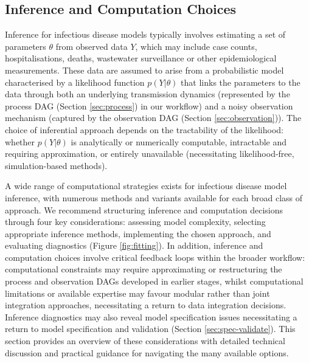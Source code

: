 \documentclass{article}
\begin{document}
\subsection{Inference and Computation Choices}\label{sec:fitting}

Inference for infectious disease models typically involves estimating a set of parameters $\theta$ from observed data $Y$, which may include case counts, hospitalisations, deaths, wastewater surveillance or other epidemiological measurements. These data are assumed to arise from a probabilistic model characterised by a likelihood function $p(Y | \theta)$ that links the parameters to the data through both an underlying transmission dynamics (represented by the process DAG (Section \ref{sec:process}) in our workflow) and a noisy observation mechanism (captured by the observation DAG (Section \ref{sec:observation})).  The choice of inferential approach depends on the tractability of the likelihood: 
whether $ p(Y | \theta)$ is analytically or numerically computable, intractable and requiring approximation, or entirely  unavailable (necessitating likelihood-free, simulation-based methods). 

A wide range of computational strategies exists for infectious disease model inference, with numerous methods and variants available for each broad class of approach.
We recommend structuring inference and computation decisions through four key considerations: assessing model complexity, selecting appropriate inference methods, implementing the chosen approach, and evaluating diagnostics (Figure \ref{fig:fitting}).
In addition, inference and computation choices involve critical feedback loops within the broader workflow: computational constraints may require approximating or restructuring the process and observation DAGs developed in earlier stages, whilst computational limitations or available expertise may favour modular rather than joint integration approaches, necessitating a return to data integration decisions.
Inference diagnostics may also reveal model specification issues necessitating a return to model specification and validation (Section \ref{sec:spec-validate}).
This section provides an overview of these considerations with detailed technical discussion and practical guidance for navigating the many available options.
\end{document}
